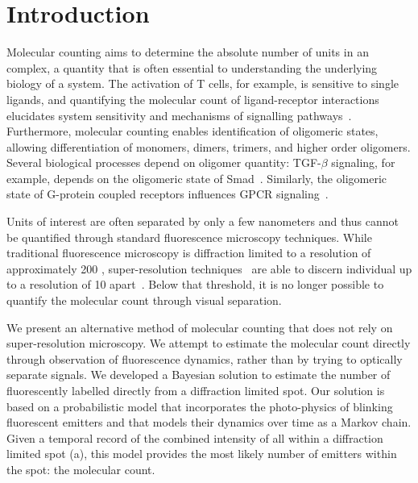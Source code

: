 \section{Introduction}



%
Molecular counting aims to determine the absolute number of units 
in an complex, a quantity that is often essential to understanding
the underlying biology of a system.
  The activation of T cells, for example, is sensitive to single ligands, and
  quantifying the molecular count of ligand-receptor interactions elucidates 
  system sensitivity and mechanisms of signalling pathways~\citep{irvine_2002}.
  Furthermore, molecular counting enables identification of oligomeric states, 
  allowing differentiation of monomers, dimers, trimers, and higher order oligomers.
  Several biological processes depend on oligomer quantity: TGF-$\beta$ signaling,
  for example, depends on the oligomeric state of Smad~\citep{inman_2002,
  moustakas_2002}.
  Similarly, the oligomeric state of G-protein coupled receptors influences 
  GPCR signaling~\citep{felce_2018, breitwieser_2004}.

%
Units of interest are often separated by only a few
nanometers and thus cannot be quantified through standard fluorescence
microscopy techniques.
  While traditional fluorescence microscopy is diffraction limited to a resolution 
  of approximately 200 \nanometer, super-resolution 
  techniques~\citep{betzig_2006,rust_2006,rittweger_sted_2009} 
  are able to discern individual \smallobjects up to a resolution of 10 \nanometer 
  apart~\citep{valli_seeing_2021}.
  Below that threshold, it is no longer possible to quantify the molecular count 
  through visual separation.

%
We present an alternative method of molecular counting 
that does not rely on super-resolution microscopy.
%
  We attempt to estimate the molecular count directly through observation of 
  fluorescence dynamics, rather than by trying to optically separate signals.
  We developed a Bayesian solution to estimate the number of
  fluorescently labelled \smallobjects directly from a diffraction limited
  spot.
  Our solution is based on a probabilistic model that incorporates the
  photo-physics of blinking fluorescent emitters and that models their dynamics over
  time as a Markov chain.
  Given a temporal record of the combined intensity of all \smallobjects within a
  diffraction limited spot (a), this model provides the 
  most likely number of emitters within the spot: the molecular count.

